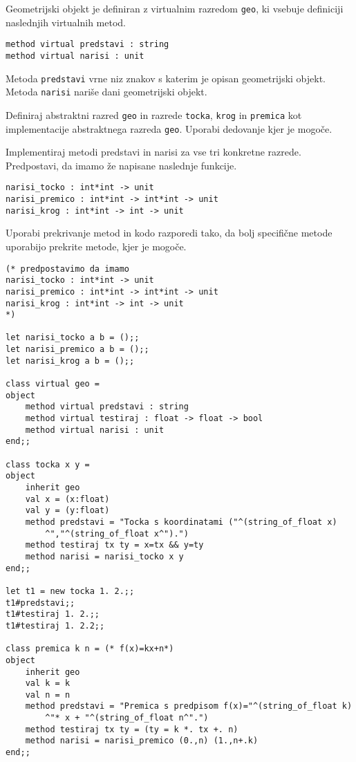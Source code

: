 \begin{ex}
Geometrijski objekt je definiran z virtualnim razredom \lstinline{geo}, ki vsebuje definiciji naslednjih virtualnih metod.

\begin{lstlisting}
method virtual predstavi : string
method virtual narisi : unit 
\end{lstlisting}

Metoda \lstinline{predstavi} vrne niz znakov s katerim je opisan geometrijski objekt. Metoda \lstinline{narisi} nari\v se dani geometrijski objekt. 

Definiraj abstraktni razred \lstinline{geo} in razrede \lstinline{tocka}, \lstinline{krog} in \lstinline{premica} kot
implementacije abstraktnega razreda \texttt{geo}. Uporabi dedovanje kjer je mogo\v ce. 

Implementiraj metodi predstavi in narisi za vse tri konkretne razrede. Predpostavi, da imamo \v ze napisane naslednje funkcije.
\begin{lstlisting}
narisi_tocko : int*int -> unit
narisi_premico : int*int -> int*int -> unit
narisi_krog : int*int -> int -> unit
\end{lstlisting}

Uporabi prekrivanje metod in kodo razporedi tako, da bolj specifi\v cne metode uporabijo prekrite metode, kjer je mogo\v ce.

\begin{sol}
\begin{lstlisting}
(* predpostavimo da imamo
narisi_tocko : int*int -> unit
narisi_premico : int*int -> int*int -> unit
narisi_krog : int*int -> int -> unit
*)

let narisi_tocko a b = ();;
let narisi_premico a b = ();;
let narisi_krog a b = ();;

class virtual geo =
object
    method virtual predstavi : string
    method virtual testiraj : float -> float -> bool
    method virtual narisi : unit
end;;

class tocka x y =
object 
    inherit geo
    val x = (x:float)
    val y = (y:float)
    method predstavi = "Tocka s koordinatami ("^(string_of_float x)
        ^","^(string_of_float x^").")
    method testiraj tx ty = x=tx && y=ty
    method narisi = narisi_tocko x y 
end;;

let t1 = new tocka 1. 2.;;
t1#predstavi;;
t1#testiraj 1. 2.;;
t1#testiraj 1. 2.2;;

class premica k n = (* f(x)=kx+n*)
object
    inherit geo
    val k = k
    val n = n
    method predstavi = "Premica s predpisom f(x)="^(string_of_float k)
        ^"* x + "^(string_of_float n^".")
    method testiraj tx ty = (ty = k *. tx +. n)
    method narisi = narisi_premico (0.,n) (1.,n+.k)
end;;


\end{lstlisting}
\end{sol}
\end{ex}
